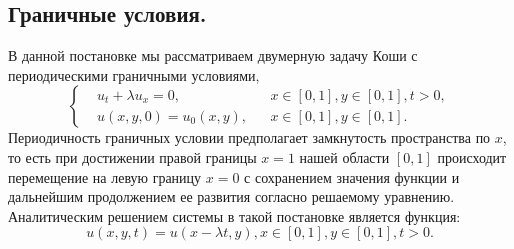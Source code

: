 \documentclass[14pt]{article}
\begin{document}
\subsection{Граничные условия.}
В данной постановке мы рассматриваем двумерную задачу Коши с периодическими граничными условиями,
\begin{equation}
 \left\lbrace
  \begin{aligned}
    &u_{t} + \lambda u_{x} = 0,  &&x \in [0,1],y \in [0,1], t>0,\\
    &u(x,y,0) = u_0 (x,y), &&x \in [0,1], y \in [0,1].
  \end{aligned} \right.
\end{equation} 
Периодичность граничных условии предполагает замкнутость  пространства по $x$, то есть при достижении правой границы $x = 1$ нашей области $[0, 1]$ происходит перемещение на левую границу $x = 0$ с сохранением значения функции и дальнейшим продолжением ее развития согласно решаемому уравнению. 
Аналитическим решением системы в такой постановке является функция:
\begin{equation}
u(x,y,t) = u(x-\lambda t,y), x \in [0,1], y \in [0,1], t>0.
\end{equation}
\end{document}
